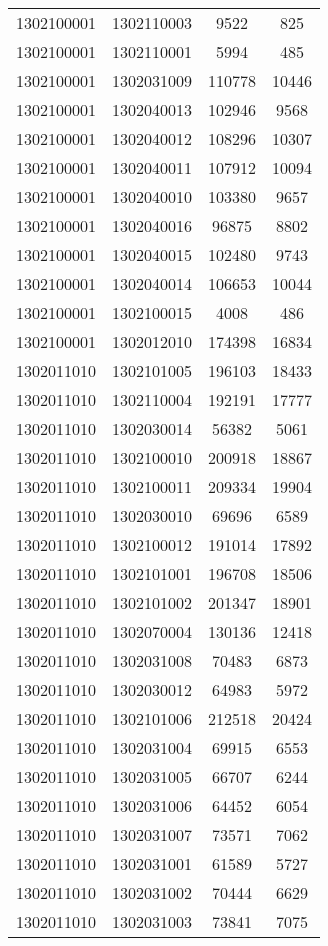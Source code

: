\begin{longtable}[h]{llcc}
		1302100001 & 1302110003 & 9522 & 825\\
		1302100001 & 1302110001 & 5994 & 485\\
		1302100001 & 1302031009 & 110778 & 10446\\
		1302100001 & 1302040013 & 102946 & 9568\\
		1302100001 & 1302040012 & 108296 & 10307\\
		1302100001 & 1302040011 & 107912 & 10094\\
		1302100001 & 1302040010 & 103380 & 9657\\
		1302100001 & 1302040016 & 96875 & 8802\\
		1302100001 & 1302040015 & 102480 & 9743\\
		1302100001 & 1302040014 & 106653 & 10044\\
		1302100001 & 1302100015 & 4008 & 486\\
		1302100001 & 1302012010 & 174398 & 16834\\
		1302011010 & 1302101005 & 196103 & 18433\\
		1302011010 & 1302110004 & 192191 & 17777\\
		1302011010 & 1302030014 & 56382 & 5061\\
		1302011010 & 1302100010 & 200918 & 18867\\
		1302011010 & 1302100011 & 209334 & 19904\\
		1302011010 & 1302030010 & 69696 & 6589\\
		1302011010 & 1302100012 & 191014 & 17892\\
		1302011010 & 1302101001 & 196708 & 18506\\
		1302011010 & 1302101002 & 201347 & 18901\\
		1302011010 & 1302070004 & 130136 & 12418\\
		1302011010 & 1302031008 & 70483 & 6873\\
		1302011010 & 1302030012 & 64983 & 5972\\
		1302011010 & 1302101006 & 212518 & 20424\\
		1302011010 & 1302031004 & 69915 & 6553\\
		1302011010 & 1302031005 & 66707 & 6244\\
		1302011010 & 1302031006 & 64452 & 6054\\
		1302011010 & 1302031007 & 73571 & 7062\\
		1302011010 & 1302031001 & 61589 & 5727\\
		1302011010 & 1302031002 & 70444 & 6629\\
		1302011010 & 1302031003 & 73841 & 7075\\

\end{longtable}
